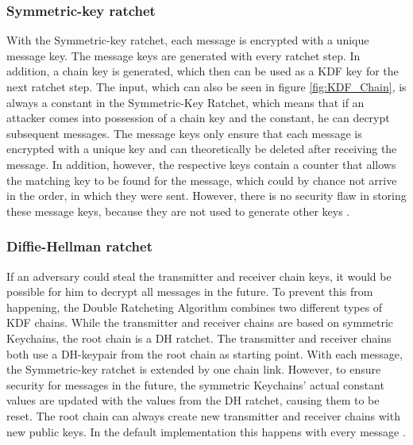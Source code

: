 \documentclass[12pt,oneside,a4paper,parskip]{scrbook}
\begin{document}
\newpage
\subsubsection{Symmetric-key ratchet}

With the Symmetric-key ratchet, each message is encrypted with a unique message key. The message keys are generated with every ratchet step. In addition, a chain key is generated, which then can be used as a KDF key for the next ratchet step. The input, which can also be seen in figure \ref{fig:KDF_Chain}, is always a constant in the Symmetric-Key Ratchet, which means that if an attacker comes into possession of a chain key and the constant, he can decrypt subsequent messages. The message keys only ensure that each message is encrypted with a unique key and can theoretically be deleted after receiving the message. In addition, however, the respective keys contain a counter that allows the matching key to be found for the message, which could by chance not arrive in the order, in which they were sent. However, there is no security flaw in storing these message keys, because they are not used to generate other keys \parencite{perrin_double_2016}.


\subsubsection{Diffie-Hellman ratchet}
If an adversary could steal the transmitter and receiver chain keys, it would be possible for him to decrypt all messages in the future. To prevent this from happening, the Double Ratcheting Algorithm combines two different types of KDF chains. While the transmitter and receiver chains are based on symmetric Keychains, the root chain is a DH ratchet. The transmitter and receiver chains both use a DH-keypair from the root chain as starting point. With each message, the Symmetric-key ratchet is extended by one chain link. However, to ensure security for messages in the future, the symmetric Keychains' actual constant values are updated with the values from the DH ratchet, causing them to be reset. The root chain can always create new transmitter and receiver chains with new public keys. In the default implementation this happens with every message \parencite{perrin_double_2016}.

\end{document}
